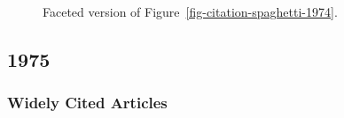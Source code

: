 \documentclass[
  10pt,
  letterpaper,
  DIV=11,
  numbers=noendperiod,
  twoside]{scrartcl}
\begin{document}
\begin{figure}


\caption{\label{fig-citation-facet-1974}Faceted version of
Figure~\ref{fig-citation-spaghetti-1974}.}

\end{figure}%

\newpage

\subsection{1975}\label{sec-s1975}

\subsubsection*{Widely Cited Articles}\label{widely-cited-articles-18}
\end{document}
